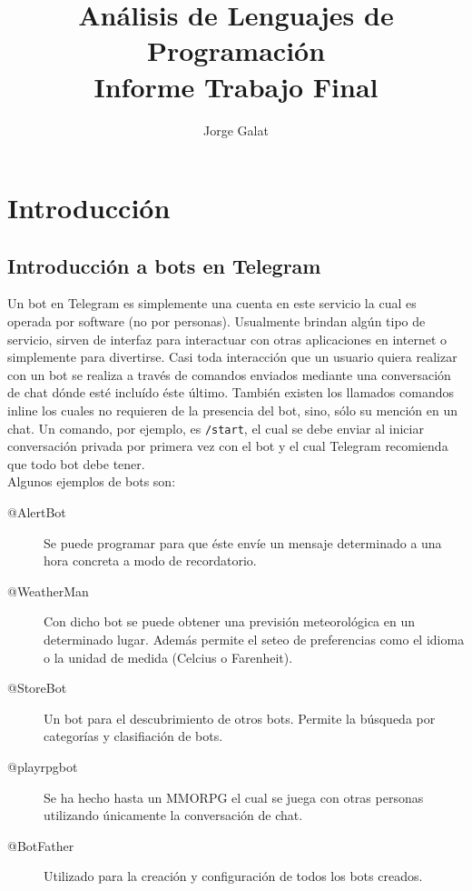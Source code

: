 \documentclass[12pt,a4paper,final]{article}
\author{Jorge Galat}
\title{Análisis de Lenguajes de Programación \\ Informe Trabajo Final}
\date{}
\begin{document}
\maketitle

\tableofcontents

\clearpage

\section{Introducción}

\subsection{Introducción a bots en Telegram}
Un bot en Telegram es simplemente una cuenta en este servicio la cual es operada por software (no por personas). Usualmente brindan algún tipo de servicio, sirven de interfaz para interactuar con otras aplicaciones en internet o simplemente para divertirse. Casi toda interacción que un usuario quiera realizar con un bot se realiza a través de comandos enviados mediante una conversación de chat dónde esté incluído éste último. También existen los llamados comandos inline los cuales no requieren de la presencia del bot, sino, sólo su mención en un chat. Un comando, por ejemplo, es \texttt{/start}, el cual se debe enviar al iniciar conversación privada por primera vez con el bot y el cual Telegram recomienda que todo bot debe tener. \\

Algunos ejemplos de bots son:
\begin{description}
\item [@AlertBot] Se puede programar para que éste envíe un mensaje determinado a una hora concreta a modo de recordatorio.
\item [@WeatherMan] Con dicho bot se puede obtener una previsión meteorológica en un determinado lugar. Además permite el seteo de preferencias como el idioma o la unidad de medida (Celcius o Farenheit).
\item [@StoreBot] Un bot para el descubrimiento de otros bots. Permite la búsqueda por categorías y clasifiación de bots.
\item [@playrpgbot] Se ha hecho hasta un MMORPG el cual se juega con otras personas utilizando únicamente la conversación de chat. 
\item [@BotFather] Utilizado para la creación y configuración de todos los bots creados.
\end{description}
\end{document}
